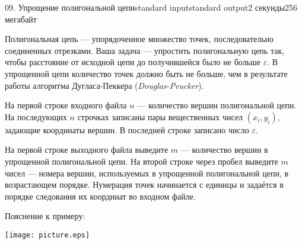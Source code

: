 \begin{problem}{09. Упрощение полигональной цепи}{standard input}{standard output}{2 секунды}{256 мегабайт}

Полигональная цепь — упорядоченное множество точек, последовательно соединенных отрезками.
Ваша задача — упростить полигональную цепь так,
чтобы расстояние от исходной цепи до получившейся было не больше $\varepsilon$. В упрощенной цепи количество точек должно быть не больше, чем в результате работы алгоритма Дугласа-Пеккера (\emph{Douglas-Peucker}).

\InputFile

На первой строке входного файла $n$ — количество вершин полигональной цепи.
На последующих $n$ строчках записаны пары вещественных чисел $(x_i, y_i)$, задающие координаты вершин.
В последней строке записано число $\varepsilon$.

\OutputFile

На первой строке выходного файла выведите $m$ — количество вершин в упрощенной полигональной цепи.
На второй строке через пробел выведите $m$ чисел — номера вершин, используемых в упрощенной полигональной цепи, в возрастающем порядке.
Нумерация точек начинается с единицы и задаётся в порядке следования их координат во входном файле.

\Examples

\begin{example}%
%
\end{example}
\Note
Пояснение к примеру:
	\begin{center}
		\texttt{[image: picture.eps]}
	\end{center}
\end{problem}
